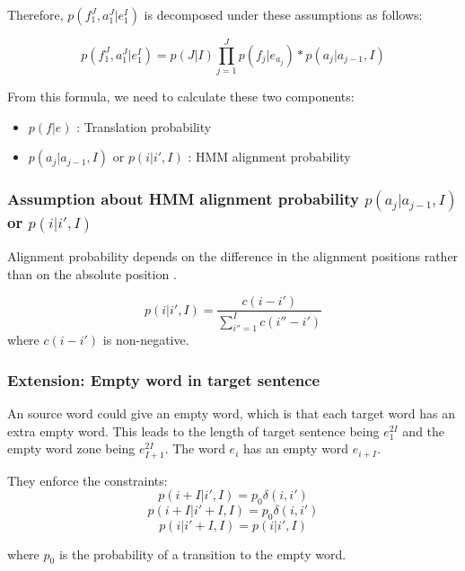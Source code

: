 \documentclass{article}
\begin{document}
Therefore, $p(f_1^J, a_1^J|e_1^I)$ is decomposed under these assumptions as follows:

\begin{equation}
p(f_1^J, a_1^J|e_1^I) = p(J|I) \prod_{j=1}^J p(f_j | e_{a_j}) * p(a_j | a_{j-1}, I)
\label{Och2003Systematic Alignment Model Equation}
\end{equation}

From this formula, we need to calculate these two components:
\begin{itemize}
\item $ p(f | e) $ : Translation probability
\item $p(a_j | a_{j-1}, I)$ or $p(i | i', I)$ : HMM alignment probability
\end{itemize}

\subsubsection{Assumption about HMM alignment probability $p(a_j | a_{j-1}, I)$ or $p(i | i', I)$}
Alignment probability depends on the difference in the alignment positions rather than on the absolute position \cite{Vogel1996HMM}.

\begin{equation}
p(i | i', I) = \frac{c(i - i')}{\sum_{i''=1}^I c(i'' - i')}
\end{equation}
where $c(i - i')$ is non-negative.

\subsubsection{Extension: Empty word in target sentence}
An source word could give an empty word, which is that each target word has an extra empty word. This leads to the length of target sentence being $e_{1}^{2I}$ and the empty word zone being $e_{I+1}^{2I}$. The word $e_{i}$ has an empty word $e_{i+I}$.

They enforce the constraints:
\begin{equation}
p(i + I | i', I) = p_{0} \delta(i, i')
\end{equation}
\begin{equation}
p(i + I | i' + I, I) = p_{0} \delta(i, i')
\end{equation}
\begin{equation}
p(i | i' + I, I) = p(i | i', I )
\end{equation}

where $p_{0}$ is the probability of a transition to the empty word.
\end{document}

